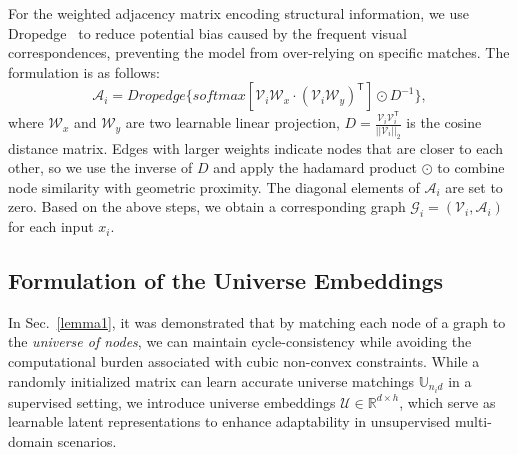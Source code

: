 For the weighted adjacency matrix encoding structural information, we use Dropedge~\cite{rongdropedge} to reduce potential bias caused by the frequent visual correspondences, preventing the model from over-relying on specific matches. The formulation is as follows:
\begin{equation}
    \mathcal{A}_i = Dropedge\{ softmax[\mathcal{V}_i \mathcal{W}_{x}\cdot(\mathcal{V}_i \mathcal{W}_{y})^{\mathsf{T}}]\odot D^{-1}\},
\end{equation}
where $\mathcal{W}_{x}$ and $\mathcal{W}_{y}$ are two learnable linear projection, $D=\frac{\mathcal{V}_i \mathcal{V}_i^{\mathsf{T}}}{||\mathcal{V}_i||_2}$ is the cosine distance matrix. Edges with larger weights indicate nodes that are closer to each other, so we use the inverse of $D$ and apply the hadamard product $\odot$ to combine node similarity with geometric proximity. The diagonal elements of $\mathcal{A}_i$ are set to zero. Based on the above steps, we obtain a corresponding graph $ \mathcal{G}_i=(\mathcal{V}_i, \mathcal{A}_i)$ for each input $x_i$. 


\subsection{Formulation of the Universe Embeddings}
\label{sec:training}
In Sec.~\ref{lemma1}, it was demonstrated that by matching each node of a graph to the \textit{universe of nodes}, we can maintain cycle-consistency while avoiding the computational burden associated with cubic non-convex constraints. While a randomly initialized matrix can learn accurate universe matchings $\mathbb{U}_{n_id}$ in a supervised setting, we introduce universe embeddings $\mathcal{U} \in \mathbb{R}^{d\times h}$, which serve as learnable latent representations to enhance adaptability in unsupervised multi-domain scenarios.

